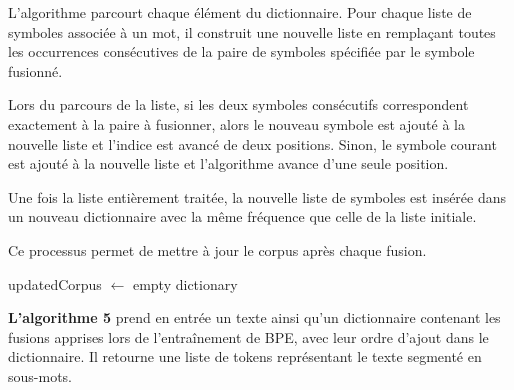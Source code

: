 \documentclass[12pt,a4paper]{report}
\begin{document}
L’algorithme parcourt chaque élément du dictionnaire. Pour chaque liste de symboles associée à un mot, il construit une nouvelle liste en remplaçant toutes les occurrences consécutives de la paire de symboles spécifiée par le symbole fusionné.

Lors du parcours de la liste, si les deux symboles consécutifs correspondent exactement à la paire à fusionner, alors le nouveau symbole est ajouté à la nouvelle liste et l’indice est avancé de deux positions. Sinon, le symbole courant est ajouté à la nouvelle liste et l’algorithme avance d’une seule position.

Une fois la liste entièrement traitée, la nouvelle liste de symboles est insérée dans un nouveau dictionnaire avec la même fréquence que celle de la liste initiale.

Ce processus permet de mettre à jour le corpus après chaque fusion.

\begin{algorithm}[H]
	\caption{UpdateCorpus}
	
	updatedCorpus $\leftarrow$ empty dictionary\;
	
	
	
\end{algorithm}

\vspace{0.5cm}

\textbf{L’algorithme 5} prend en entrée un texte ainsi qu’un dictionnaire contenant les fusions apprises lors de l’entraînement de BPE, avec leur ordre d’ajout dans le dictionnaire. Il retourne une liste de tokens représentant le texte segmenté en sous-mots.
\end{document}
